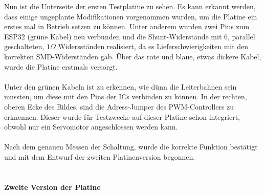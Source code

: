 \documentclass[titlepage,12pt,twoside]{article}
\begin{document}
\hfill \break
Nun ist die Unterseite der ersten Testplatine zu sehen. Es kann erkannt werden, dass einige ungeplante Modifikationen vorgenommen wurden, um die Platine ein erstes mal in Betrieb setzen zu können. Unter anderem wurden zwei Pins zum ESP32 (grüne Kabel)
neu verbunden und die Shunt-Widerstände mit 6, parallel geschalteten, $1\Omega$ Widersständen realisiert, da es Lieferschwierigkeiten mit den korrekten SMD-Widerständen gab. Über das rote und blaue, etwas dickere Kabel, wurde die Platine erstmals versorgt. \\
\\
Unter den grünen Kabeln ist zu erkennen, wie dünn die Leiterbahnen sein mussten, um diese mit den Pins der ICs verbinden zu können. In der rechten, oberen Ecke des Bildes, sind die Adress-Jumper des PWM-Controllers zu erknennen. Dieser wurde für Testzwecke 
auf dieser Platine schon integriert, obwohl nur ein Servomotor angeschlossen werden kann. \\
\\
Nach dem genauen Messen der Schaltung, wurde die korrekte Funktion bestätigt und mit dem Entwurf der zweiten Platinenversion begonnen. \\
\\
\newpage
\paragraph{Zweite Version der Platine}
\hfill \break
\hfill \break
\end{document}
